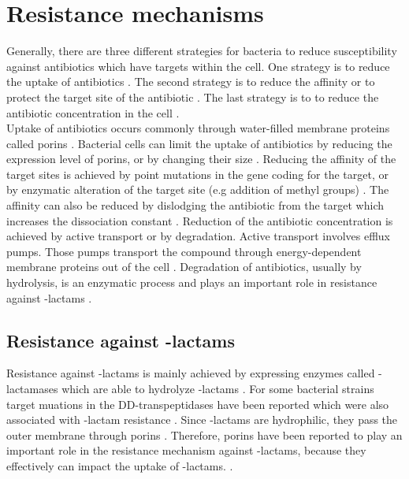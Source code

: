 \section{Resistance mechanisms}
Generally, there are three different strategies for bacteria to reduce susceptibility against antibiotics which have targets within the cell. One strategy is to reduce the uptake of antibiotics \cite{barreteau_cytoplasmic_2008}. The second strategy is to reduce the affinity or to protect the target site of the antibiotic \cite{munita_mechanisms_2016}. The last strategy is to  to reduce the antibiotic concentration in the cell \cite{munita_mechanisms_2016}.\\
Uptake of antibiotics occurs commonly through water-filled membrane proteins called porins \cite{fernandez_adaptive_2012}. Bacterial cells can limit the uptake of antibiotics by reducing the expression level of porins, or by changing their size \cite{fernandez_adaptive_2012}.
Reducing the affinity of the target sites is achieved by point mutations in the gene coding for the target, or by enzymatic alteration of the target site (e.g addition of methyl groups) \cite{munita_mechanisms_2016}. The affinity can also be reduced by dislodging the antibiotic from the target which increases the dissociation constant \cite{connell_ribosomal_2003}.
Reduction of the antibiotic concentration is achieved by active transport or by degradation. Active transport involves efflux pumps. Those pumps transport the compound through energy-dependent membrane proteins out of the cell \cite{fernandez_adaptive_2012}. Degradation of antibiotics, usually by hydrolysis, is an enzymatic process and plays an important role in resistance against \textbeta-lactams \cite{poole_resistance_2004}.  
\subsection{Resistance against \textbeta-lactams}
Resistance against \textbeta-lactams is mainly achieved by expressing enzymes called \textbeta-lactamases which are able to hydrolyze \textbeta-lactams \cite{poole_resistance_2004}. For some bacterial strains target muations in the DD-transpeptidases have been reported which were also associated with \textbeta-lactam resistance \cite{poole_resistance_2004}. Since \textbeta-lactams are hydrophilic, they pass the outer membrane through porins \cite{munita_mechanisms_2016}. Therefore, porins have been reported to play an important role in the resistance mechanism against \textbeta-lactams, because they effectively can impact the uptake of \textbeta-lactams. \cite{poole_resistance_2004}.
